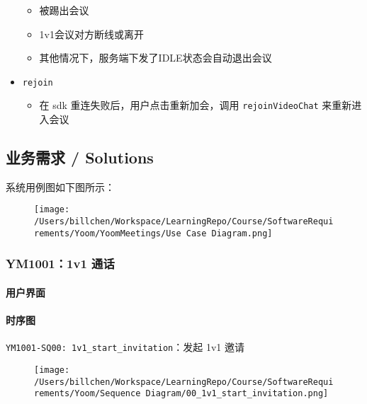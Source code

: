 \documentclass[]{ctexart}
\let\oldparagraph\paragraph
\renewcommand{\paragraph}[1]{\oldparagraph{#1}\mbox{}}
\begin{document}
\begin{itemize}
  \begin{itemize}
  \item
    被踢出会议
  \item
    1v1会议对方断线或离开
  \item
    其他情况下，服务端下发了IDLE状态会自动退出会议
  \end{itemize}
\item
  \texttt{rejoin}

  \begin{itemize}
  \item
    在 sdk 重连失败后，用户点击重新加会，调用 \texttt{rejoinVideoChat}
    来重新进入会议
  \end{itemize}
\end{itemize}

\hypertarget{ux4e1aux52a1ux9700ux6c42--solutions}{%
\subsection{业务需求 /
Solutions}\label{ux4e1aux52a1ux9700ux6c42--solutions}}

系统用例图如下图所示：

\begin{figure}
\centering
\texttt{[image: /Users/billchen/Workspace/LearningRepo/Course/SoftwareRequirements/Yoom/YoomMeetings/Use Case Diagram.png]}
\caption{}
\end{figure}

\hypertarget{ym10011v1-ux901aux8bdd-1}{%
\subsubsection{YM1001：1v1 通话}\label{ym10011v1-ux901aux8bdd-1}}

\hypertarget{ux7528ux6237ux754cux9762-1}{%
\paragraph{用户界面}\label{ux7528ux6237ux754cux9762-1}}

\hypertarget{ux65f6ux5e8fux56fe-1}{%
\paragraph{时序图}\label{ux65f6ux5e8fux56fe-1}}

\texttt{YM1001-SQ00:\ 1v1\_start\_invitation}：发起 1v1 邀请

\begin{figure}
\centering
\texttt{[image: /Users/billchen/Workspace/LearningRepo/Course/SoftwareRequirements/Yoom/Sequence Diagram/00\_1v1\_start\_invitation.png]}
\caption{}
\end{figure}
\end{document}
